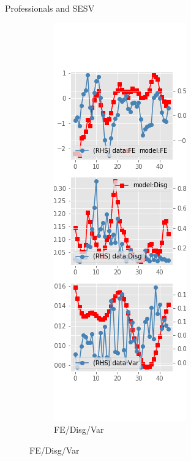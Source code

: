 \documentclass{beamer}
\begin{document}
\begin{frame}{Professionals and SESV}
\begin{figure}[ht]
\begin{subfigure}[b]{0.2\textwidth}
		\end{subfigure}
		\hfill
		\begin{subfigure}[b]{0.2\textwidth}
			\caption{FE/Disg/Var}
			\includegraphics[width=\textwidth, height = 0.8\textheight]{figuresDraft/spf_se_est_sv_diag3.png}
		\end{subfigure}
	\end{figure}
\end{frame}
\end{document}
